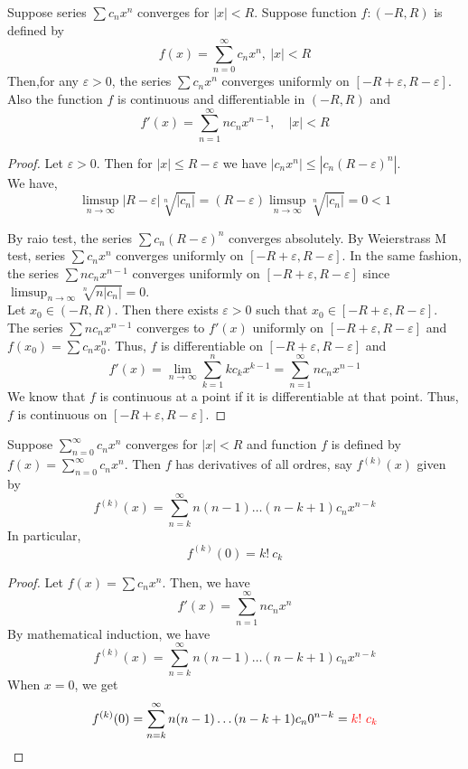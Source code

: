 \begin{theorem}
	Suppose series $\sum c_n x^n$ converges for $|x| < R$.
	Suppose function $f : (-R,R)$ is defined by \[ f(x) = \sum_{n = 0}^\infty c_n x^n,\ |x| < R \]
	Then,for any $\varepsilon > 0$, the series $\sum c_n x^n$ converges uniformly on $[-R+\varepsilon,R-\varepsilon]$.
	Also the function $f$ is continuous and differentiable in $(-R,R)$ and
	\[ f'(x) = \sum_{n = 1}^\infty nc_n x^{n-1},\quad |x| < R \]
\end{theorem}
\begin{proof}
	Let $\varepsilon > 0$.
	Then for $|x| \le R - \varepsilon$ we have $|c_n x^n| \le |c_n (R-\varepsilon)^n|$.\\

	We have, 
	\[ \limsup_{n \to \infty} |R-\varepsilon| \sqrt[n]{|c_n|} = (R-\varepsilon) \limsup_{n \to\infty} \sqrt[n]{|c_n|} = 0 < 1 \]

	By raio test, the series $\sum c_n (R-\varepsilon)^n$ converges absolutely.
	By Weierstrass M test, series $\sum c_n x^n$ converges uniformly on $[-R+\varepsilon,R-\varepsilon]$.
	In the same fashion, the series $\sum nc_n x^{n-1}$ converges uniformly on $[-R+\varepsilon,R-\varepsilon]$ since $\displaystyle \limsup_{n \to \infty} \sqrt[n]{n|c_n|} = 0$.\\

	Let $x_0 \in (-R,R)$.
	Then there exists $\varepsilon > 0$ such that $x_0 \in [-R+\varepsilon, R-\varepsilon]$.
	The series $\sum n c_n x^{n-1}$ converges to $f'(x)$ uniformly on $[-R+\varepsilon,R-\varepsilon]$ and $f(x_0) = \sum c_n x_0^n$.
	Thus, $f$ is differentiable on $[-R+\varepsilon,R-\varepsilon]$ and
	\[ f'(x) = \lim_{n \to \infty} \sum_{k=1}^n k c_k x^{k-1} = \sum_{n = 1}^\infty n c_n x^{n-1} \]
	We know that $f$ is continuous at a point if it is differentiable at that point.
	Thus, $f$ is continuous on $[-R+\varepsilon,R-\varepsilon]$.
\end{proof}

\begin{corollary}
	Suppose $\displaystyle \sum_{n = 0}^\infty c_n x^n$ converges for $|x| < R$ and function $f$ is defined by $f(x) = \displaystyle \sum_{n = 0}^\infty c_n x^n$.
	Then $f$ has derivatives of all ordres, say $f^{(k)}(x)$ given by
	\[ f^{(k)}(x) = \sum_{n=k}^\infty n(n-1)\dots(n-k+1)c_n x^{n-k} \]
	In particular,
	\[ f^{(k)}(0) = k!\ c_k \]
\end{corollary}
\begin{proof}
	Let $f(x) = \sum c_n x^n$.
	Then, we have 
	\[ f'(x) = \sum_{n = 1}^\infty n c_n x^n \]
	By mathematical induction, we have
	\[ f^{(k)}(x) = \sum_{n = k}^\infty n(n-1)\dots(n-k+1) c_n x^{n-k} \]
	When $x = 0$, we get
	\[ f^{(k)}(0) = \sum_{n = k}^\infty n(n-1)\dots(n-k+1) c_n 0^{n-k} = {\color{red}k!\ c_k} \]
\end{proof}

